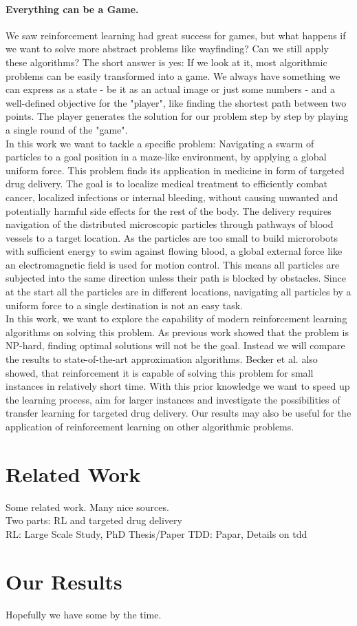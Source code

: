  \paragraph{Everything can be a Game.}
 We saw reinforcement learning had great success for games, but what happens if we want to solve more abstract problems like wayfinding? Can we still apply these algorithms? The short answer is yes: If we look at it, most algorithmic problems can be easily transformed into a game. We always have something we can express as a state - be it as an actual image or just some numbers - and a well-defined objective for the "player", like finding the shortest path between two points. The player generates the solution for our problem step by step by playing a single round of the "game". \\
 In this work we want to tackle a specific problem: Navigating a swarm of particles to a goal position in a maze-like environment, by applying a global uniform force. This problem finds its application in medicine in form of targeted drug delivery. The goal is to localize medical treatment to efficiently combat cancer, localized infections or internal bleeding, without causing unwanted and potentially harmful side effects for the rest of the body. The delivery requires navigation of the distributed microscopic particles through pathways of blood vessels to a target location. As the particles are too small to build microrobots with sufficient energy to swim against flowing blood, a global external force like an electromagnetic field is used for motion control. This means all particles are subjected into the same direction unless their path is blocked by obstacles. Since at the start all the particles are in different locations, navigating all particles by a uniform force to a single destination is not an easy task. \\ 
 In this work, we want to explore the capability of modern reinforcement learning algorithms on solving this problem. As previous work \cite{becker2020} showed that the problem is NP-hard, finding optimal solutions will not be the goal. Instead we will compare the results to state-of-the-art approximation algorithms. Becker et al. also showed, that reinforcement it is capable of solving this problem for small instances in relatively short time. With this prior knowledge we want to speed up the learning process, aim for larger instances and investigate the possibilities of transfer learning for targeted drug delivery. Our results may also be useful for the application of reinforcement learning on other algorithmic problems.

 \section{Related Work} \label{sec:RelatedWork}
 Some related work. Many nice sources. \\
 Two parts: RL and targeted drug delivery \\
 RL: Large Scale Study, PhD Thesis/Paper
 TDD: Papar, Details on tdd


\section{Our Results} \label{sec:Results}
Hopefully we have some by the time.